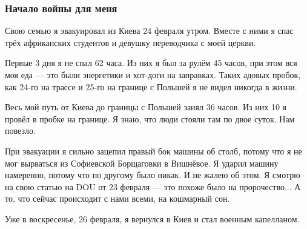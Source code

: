  
 
 
 
 

\subsubsection{Начало войны для меня}
\label{sec:29_03_2022.stz.pc.ua.dou.1.kapellan.2.nachalo}

Свою семью я эвакуировал из Киева 24 февраля утром. Вместе с ними я спас трёх
африканских студентов и девушку переводчика с моей церкви.

Первые 3 дня я не спал 62 часа. Из них я был за рулём 45 часов, при этом вся
моя еда — это были энергетики и хот-доги на заправках. Таких адовых пробок, как
24-го на трассе и 25-го на границе с Польшей я не видел никогда в жизни.

Весь мой путь от Киева до границы с Польшей занял 36 часов. Из них 10 я провёл
в пробке на границе. Я знаю, что люди стояли там по двое суток. Нам повезло.

При эвакуации я сильно зацепил правый бок машины об столб, потому что я не мог
вырваться из Софиевской Борщаговки в Вишнёвое. Я ударил машину намеренно,
потому что по другому было никак. И не жалею об этом. Я смотрю на свою статью
на DOU от 23 февраля — это похоже было на пророчество... А то, что сейчас
происходит с нами всеми, на кошмарный сон.

Уже в воскресенье, 26 февраля, я вернулся в Киев и стал военным капелланом.
